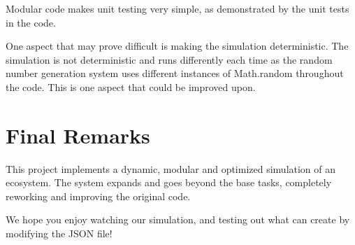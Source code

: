 \documentclass[10pt, a4paper]{scrartcl}
\begin{document}
\begin{multicols}{2}
        Modular code makes unit testing very simple, as demonstrated by the unit tests in the code.

        One aspect that may prove difficult is making the simulation deterministic. The simulation is not deterministic and runs differently each time as the random number generation system uses different instances of Math.random throughout the code. This is one aspect that could be improved upon.

        \section{Final Remarks} This project implements a dynamic, modular and optimized simulation of an ecosystem. The system expands and goes beyond the base tasks, completely reworking and improving the original code.

        We hope you enjoy watching our simulation, and testing out what can create by modifying the JSON file!

    \end{multicols}
\end{document}
